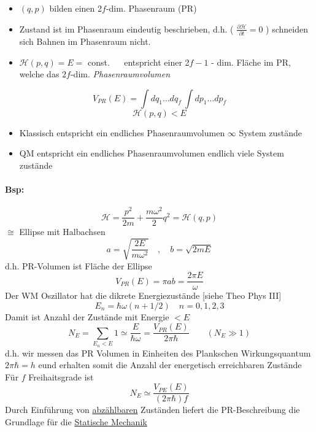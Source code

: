 \documentclass[titlepage,12pt,a4paper,ngerman]{report}
\begin{document}
\begin{minipage}{.65\textwidth}
	\begin{itemize}
		\item $(q,p)$ bilden einen 2$f$-dim. Phasenraum (PR)
		\item Zustand ist im Phasenraum eindeutig beschrieben, d.h. ( $\frac{\partial \mathcal H}{\partial t}= 0$ ) schneiden sich Bahnen im Phasenraum nicht.
		\item $\mathcal H(p,q) = E =$ const. $\quad$ entspricht einer 2$f - 1$ - dim. Fläche im PR, welche das $2f$-dim. \textit{Phasenraumvolumen}
	\end{itemize}
\end{minipage}%
\begin{minipage}{.35\textwidth}%
\end{minipage}  
$$V_{PR} (E) = \int dq_1 \dots dq_f\ \int dp_1 \dots dp_f$$
$$\mathcal H (p,q) < E$$
\begin{itemize}
	\item Klassisch entspricht ein endliches Phasenraumvolumen $\infty$ System zustände
	\item QM entspricht ein endliches Phasenraumvolumen endlich viele System zustände
\end{itemize}

\paragraph{Bsp:}
$$\mathcal H = \frac{p^2}{2m} + \frac{m\omega^2}{2} q^2 = \mathcal H(q,p)$$
$\cong$ Ellipse mit Halbachsen
$$a = \sqrt{\frac{2E}{m \omega^2}} \quad , \quad b = \sqrt{2mE}$$
d.h. PR-Volumen ist Fläche der Ellipse 
$$V_{PR} (E) = \pi a b = \frac{2 \pi E}{\omega}$$
Der WM Oszillator hat die dikrete Energiezustände [siehe Theo Phys III]
$$E_n = \hbar \omega ( n+ 1/2 ) \quad n = 0,1,2,3$$
Damit ist Anzahl der Zustände mit Energie $< E$
$$N_E = \sum_{E_n < E} 1 \simeq \frac{E}{\hbar \omega} = \frac{V_{PR} (E)}{2 \pi \hbar} \qquad ( N_E \gg 1)$$
d.h. wir messen das PR Volumen in Einheiten des Plankschen Wirkungsquantum $2 \pi \hbar = h$ eund erhalten somit die Anzahl der energetisch erreichbaren Zustände\\
Für $f$ Freihaitsgrade ist $$N_E \simeq \frac{V_{PE}(E)}{(2\pi \hbar) f}$$
Durch Einführung von \underline{abzählbaren} Zuständen liefert die PR-Beschreibung die Grundlage für die \underline{Statische Mechanik}
\end{document}
